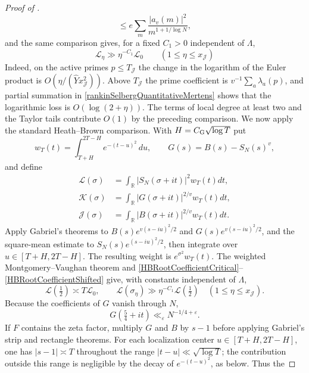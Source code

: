 \documentclass[oneside, 12pt]{amsart}
\theoremstyle{definition}
\begin{document}
{\begin{proof}[Proof of ]
\[			\leq e\sum_m\frac{|a_v(m)|^2}{m^{1+1/\log N}},
			\]
			and the same comparison gives, for a fixed $C_1>0$ independent of $\Lambda$,
			\begin{equation}\label{HBRootCoefficientShifted}
				\mathscr L_\eta\gg\eta^{-C_1}\mathscr L_0
				\qquad(1\leq\eta\leq x_{\mathscr J})
			\end{equation}
			Indeed, on the active primes $p\leq T_{\mathscr J}$ the change in the
			logarithm of the Euler product is
			$O(\eta/(\widehat Yx_{\mathscr J}^2))$.  Above
			$T_{\mathscr J}$ the prime coefficient is
			$v^{-1}\sum_a\lambda_a(p)$, and partial summation in
			\eqref{rankinSelbergQuantitativeMertens} shows that the logarithmic loss
			is $O(\log(2+\eta))$.  The terms of local degree at least two and the
			Taylor tails contribute $O(1)$ by the preceding comparison.
			We now apply the standard Heath--Brown comparison.  With
			$H=C_{\rm G}\sqrt{\log T}$ put
			\[
			w_T(t)=\int_{T+H}^{2T-H}e^{-(t-u)^2}\,du,
			\qquad G(s)=B(s)-S_N(s)^v,
			\]
			and define
			\begin{align*}
				\mathcal L(\sigma)&=\int_{\mathbb R}|S_N(\sigma+it)|^2w_T(t)dt,\\
				\mathcal K(\sigma)&=\int_{\mathbb R}|G(\sigma+it)|^{2/v}w_T(t)dt,\\
				\mathcal J(\sigma)&=\int_{\mathbb R}|B(\sigma+it)|^{2/v}w_T(t)dt.
			\end{align*}
			Apply Gabriel's theorems to
			$B(s)e^{v(s-iu)^2/2}$ and $G(s)e^{v(s-iu)^2/2}$, and the square-mean
			estimate to $S_N(s)e^{(s-iu)^2/2}$, then integrate over
			$u\in[T+H,2T-H]$.  The resulting weight is $e^{\sigma^2}w_T(t)$.
			The weighted Montgomery--Vaughan theorem and
			\eqref{HBRootCoefficientCritical}--\eqref{HBRootCoefficientShifted}
			give, with constants independent of $\Lambda$,
			\begin{equation}\label{HBWeightedRelativeL}
				\mathcal L(\tfrac12)\asymp T\mathscr L_0,
				\qquad
				\mathcal L(\sigma_\eta)\gg
				\eta^{-C_1}\mathcal L(\tfrac12)
				\quad(1\leq\eta\leq x_{\mathscr J}).
			\end{equation}
			Because the coefficients of $G$ vanish through $N$,
			\[
			G(\tfrac54+it)\ll_\varepsilon N^{-1/4+\varepsilon}.
			\]
			If $F$ contains the zeta factor, multiply $G$ and $B$ by $s-1$ before
			applying Gabriel's strip and rectangle theorems.  For each localization
			center $u\in[T+H,2T-H]$, one has $|s-1|\asymp T$ throughout the
			range $|t-u|\ll\sqrt{\log T}$; the contribution outside this range
			is negligible by the decay of $e^{-(t-u)^2}$, as below.  Thus the

\end{proof}}
\end{document}
